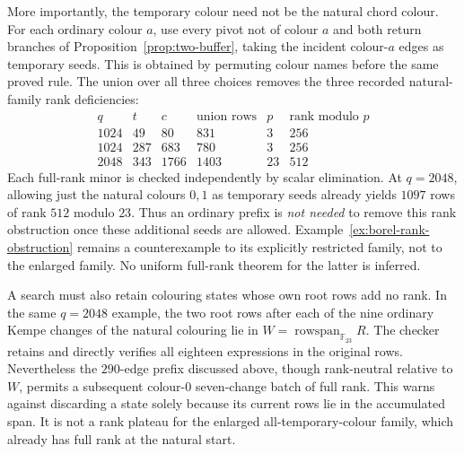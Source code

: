 \documentclass[11pt,a4paper]{article}
\theoremstyle{definition}
\theoremstyle{remark}
\begin{document}
More importantly, the temporary colour need not be the natural chord colour.  For each ordinary colour $a$, use every pivot not of colour $a$ and both return branches of Proposition~\ref{prop:two-buffer}, taking the incident colour-$a$ edges as temporary seeds.  This is obtained by permuting colour names before the same proved rule.  The union over all three choices removes the three recorded natural-family rank deficiencies:
\[
\begin{array}{r|r|r|r|r|r}
q&t&c&\text{union rows}&p&\text{rank modulo }p\\\hline
1024&49&80&831&3&256\\
1024&287&683&780&3&256\\
2048&343&1766&1403&23&512
\end{array}
\]
Each full-rank minor is checked independently by scalar elimination.  At $q=2048$, allowing just the natural colours $0,1$ as temporary seeds already yields $1097$ rows of rank $512$ modulo $23$.  Thus an ordinary prefix is \emph{not needed} to remove this rank obstruction once these additional seeds are allowed.  Example~\ref{ex:borel-rank-obstruction} remains a counterexample to its explicitly restricted family, not to the enlarged family.  No uniform full-rank theorem for the latter is inferred.

A search must also retain colouring states whose own root rows add no rank.  In the same $q=2048$ example, the two root rows after each of the nine ordinary Kempe changes of the natural colouring lie in $W=\operatorname{rowspan}_{\mathbb F_{23}}R$.  The checker retains and directly verifies all eighteen expressions in the original rows.  Nevertheless the $290$-edge prefix discussed above, though rank-neutral relative to $W$, permits a subsequent colour-$0$ seven-change batch of full rank.  This warns against discarding a state solely because its current rows lie in the accumulated span.  It is not a rank plateau for the enlarged all-temporary-colour family, which already has full rank at the natural start.
\end{document}
